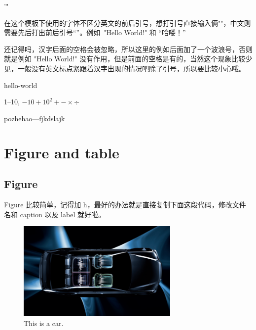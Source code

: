 '"

在这个模板下使用的字体不区分英文的前后引号，想打引号直接输入俩""，中文则需要先后打出前后引号“”。例如~"Hello World!" 和 “哈喽！”

还记得吗，汉字后面的空格会被忽略，所以这里的例如后面加了一个波浪号，否则就是例如 "Hello World!" 没有作用，但是前面的空格是有的，当然这个现象比较少见，一般没有英文标点紧跟着汉字出现的情况吧除了引号，所以要比较小心哦。

hello-world

1--10, $-10+10^2+-\times \div$

pozhehao---fjkdslajk
\section{Figure and table}

\subsection{Figure}
Figure 比较简单，记得加 h，最好的办法就是直接复制下面这段代码，修改文件名和 caption
以及 label 就好啦。
\\  %
\begin{figure}[h]
    \centering
    \includegraphics[width=0.7\textwidth]{Img/Chap1/fig1a}
    \caption{This is a car.}
    \label{fig:car}
\end{figure}

